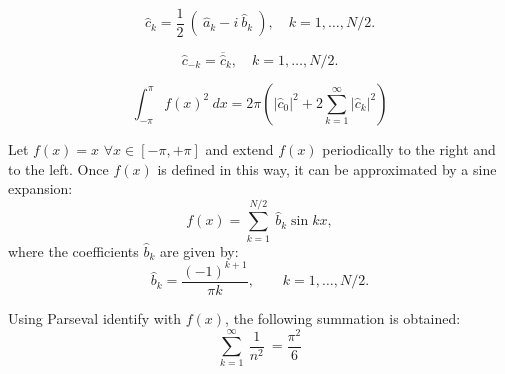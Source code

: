 \begin{equation} 
	\hat{c}_k  =  \frac{1}{2} \ ( \ \hat{a}_k  - i \ \hat{b}_k \ ),  \quad k=1, \ldots, N/2. 
\end{equation}	

\begin{equation} 
	\hat{c}_{-k}  =  \overline{ \hat{c}} _{k}  , \quad k=1, \ldots, N/2. 
\end{equation} 	


\begin{equation} 
	\int _{-\pi} ^{\pi} f(x)^2 \ dx = 2 \pi \left(    | \hat{c}_0 |^2 + 2 \sum_{k=1} ^{\infty} |  \hat{c}_k  |^2 \right) 
\end{equation} 

Let $ f(x) = x $ $ \forall x \in [-\pi, +\pi ] $ and extend $ f(x) $  periodically to the right and to the left. Once $ f(x) $ is defined in 
this way, it can be approximated by a sine expansion: 
\begin{equation} 
	f ( x)  =  \sum_{k=1} ^{N/2} \   \hat{b}_k  \sin k x, 
\end{equation} 
where the coefficients $ \hat{b}_k $ are given by:
\begin{equation} 
	\hat{b}_k   = \frac{ (-1)^{k+1} }{ \pi k }, \qquad k=1, \ldots, N/2. 
\end{equation} 

Using Parseval identify with $ f(x)$, the following  summation is obtained: 
\begin{equation} 
	\sum_{k=1} ^{\infty} \  \frac{1}{n^2}  \  = \frac{\pi^2}{6}
\end{equation} 


